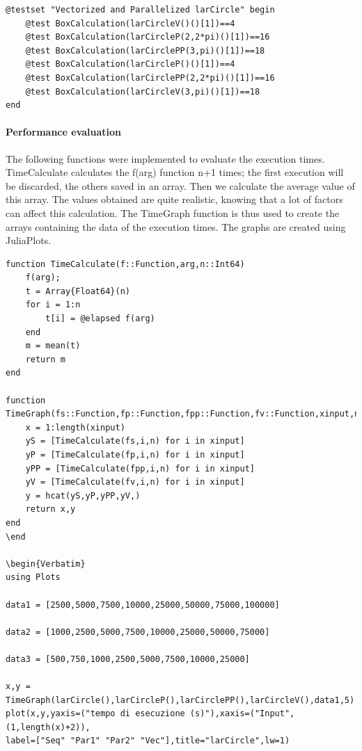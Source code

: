 \documentclass{article}
\begin{document}
\begin{Verbatim}
@testset "Vectorized and Parallelized larCircle" begin
    @test BoxCalculation(larCircleV()()[1])==4
    @test BoxCalculation(larCircleP(2,2*pi)()[1])==16
    @test BoxCalculation(larCirclePP(3,pi)()[1])==18
    @test BoxCalculation(larCircleP()()[1])==4
    @test BoxCalculation(larCirclePP(2,2*pi)()[1])==16
    @test BoxCalculation(larCircleV(3,pi)()[1])==18
end
\end{Verbatim}

\paragraph{Performance evaluation\\}

The following functions were implemented to evaluate the execution times.
TimeCalculate calculates the f(arg) function n+1 times; the first execution will be discarded, the others saved in an array. Then we calculate the average value of this array. The values obtained are quite realistic, knowing that a lot of factors can affect this calculation. The TimeGraph function is thus used to create the arrays containing the data of the execution times. The graphs are created using JuliaPlots.

\begin{Verbatim}
function TimeCalculate(f::Function,arg,n::Int64)
    f(arg);
    t = Array{Float64}(n)
    for i = 1:n
        t[i] = @elapsed f(arg)
    end
    m = mean(t)
    return m
end

function TimeGraph(fs::Function,fp::Function,fpp::Function,fv::Function,xinput,n::Int64)
    x = 1:length(xinput)
    yS = [TimeCalculate(fs,i,n) for i in xinput]
    yP = [TimeCalculate(fp,i,n) for i in xinput]
    yPP = [TimeCalculate(fpp,i,n) for i in xinput]
    yV = [TimeCalculate(fv,i,n) for i in xinput]
    y = hcat(yS,yP,yPP,yV,)
    return x,y
end
\end

\begin{Verbatim}
using Plots 

data1 = [2500,5000,7500,10000,25000,50000,75000,100000]

data2 = [1000,2500,5000,7500,10000,25000,50000,75000]

data3 = [500,750,1000,2500,5000,7500,10000,25000]

x,y = TimeGraph(larCircle(),larCircleP(),larCirclePP(),larCircleV(),data1,5)
plot(x,y,yaxis=("tempo di esecuzione (s)"),xaxis=("Input",(1,length(x)+2)),
label=["Seq" "Par1" "Par2" "Vec"],title="larCircle",lw=1)

\end{Verbatim}
\end{document}
